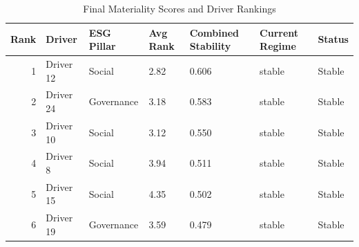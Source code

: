 \begin{table}
\caption{Final Materiality Scores and Driver Rankings}
\label{tab:final_materiality}
\begin{tabular}{rllllll}
\toprule
Rank & Driver & ESG Pillar & Avg Rank & Combined Stability & Current Regime & Status \\
\midrule
1 & Driver 12 & Social & 2.82 & 0.606 & stable & Stable \\
2 & Driver 24 & Governance & 3.18 & 0.583 & stable & Stable \\
3 & Driver 10 & Social & 3.12 & 0.550 & stable & Stable \\
4 & Driver 8 & Social & 3.94 & 0.511 & stable & Stable \\
5 & Driver 15 & Social & 4.35 & 0.502 & stable & Stable \\
6 & Driver 19 & Governance & 3.59 & 0.479 & stable & Stable \\
\bottomrule
\end{tabular}
\end{table}
